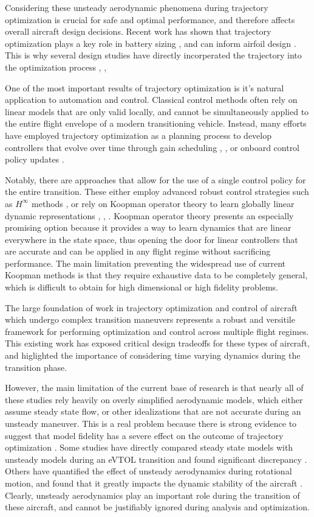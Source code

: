 \documentclass[12pt, letterpaper]{article}
\begin{document}
Considering these unsteady aerodynamic phenomena during trajectory optimization is crucial for safe and optimal performance, and therefore affects overall aircraft design decisions.  Recent work has shown that trajectory optimization plays a key role in battery sizing \cite{}, and can inform airfoil design \cite{}.  This is why several design studies have directly incorperated the trajectory into the optimization process \cite{}, \cite{}, \cite{} 

One of the most important results of trajectory optimization is it's natural application to automation and control.  Classical control methods often rely on linear models that are only valid locally, and cannot be simultaneously applied to the entire flight envelope of a modern transitioning vehicle.  Instead, many efforts have employed trajectory optimization as a planning process to develop controllers that evolve over time through gain scheduling \cite{}, \cite{}, or onboard control policy updates \cite{}.

Notably, there are approaches that allow for the use of a single control policy for the entire transition.  These either employ advanced robust control strategies such as $H^{\infty}$ methods \cite{}, or rely on Koopman operator theory to learn globally linear dynamic representations \cite{}, \cite{}, \cite{}.  Koopman operator theory presents an especially promising option because it provides a way to learn dynamics that are linear everywhere in the state space, thus opening the door for linear controllers that are accurate and can be applied in any flight regime without sacrificing performance.  The main limitation preventing the widespread use of current Koopman methods is that they require exhaustive data to be completely general, which is difficult to obtain for high dimensional or high fidelity problems. 

The large foundation of work in trajectory optimization and control of aircraft which undergo complex transition maneuvers represents a robust and versitile framework for performing optimization and control across multiple flight regimes.  This existing work has exposed critical design tradeoffs for these types of aircraft, and higlighted the importance of considering time varying dynamics during the transition phase.  

However, the main limitation of the current base of research is that nearly all of these studies rely heavily on overly simplified aerodynamic models, which either assume steady state flow, or other idealizations that are not accurate during an unsteady maneuver.  This is a real problem because there is strong evidence to suggest that model fidelity has a severe effect on the outcome of trajectory optimization \cite{}.  Some studies have directly compared steady state models with unsteady models during an eVTOL transition and found significant discrepancy \cite{}.  Others have quantified the effect of unsteady aerodynamics during rotational motion, and found that it greatly impacts the dynamic stability of the aircraft \cite{}.  Clearly, unsteady aerodynamics play an important role during the transition of these aircraft, and cannot be justifiably ignored during analysis and optimization. 
\end{document}
